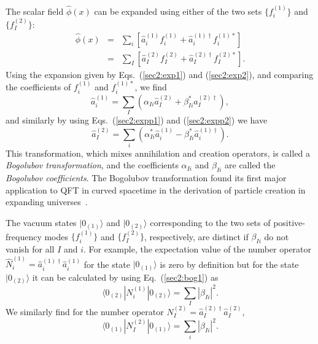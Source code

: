 \documentclass[12pt,nofootinbib,floatfix,aps,prd,showpacs,amsmath,amssymb,eqsecnum]{revtex4-2}
\let\cite\citep
\begin{document}
The scalar field $\hat{\phi}(x)$ 
can be expanded using either of the two sets $\{f_i^{(1)}\}$ and 
$\{f_I^{(2)}\}$:
\begin{eqnarray}
\hat{\phi}(x) & = & 
\sum_i \left[ \hat{a}_i^{(1)}f_i^{(1)} + \hat{a}_i^{(1)\dagger}
f_i^{(1)*}\right] \nonumber \\
& = & \sum_I\left[ \hat{a}_I^{(2)}f_I^{(2)} + \hat{a}_I^{(2)\dagger}
f_I^{(2)*}\right].
\end{eqnarray}
Using the expansion given by Eqs.~(\ref{sec2:exp1}) and (\ref{sec2:exp2}),
and comparing the coefficients of $f_i^{(1)}$ and $f_i^{(1)*}$, we find
\begin{equation}
\hat{a}_i^{(1)} = \sum_I (\alpha_{Ii}\hat{a}_I^{(2)} 
+ \beta_{Ii}^* \hat{a}_I^{(2)\dagger}), \label{sec2:bog1}
\end{equation} 
and similarly by using 
Eqs.~(\ref{sec2:expp1}) and (\ref{sec2:expp2}) we have
\begin{equation}
\hat{a}_I^{(2)} = \sum_i (\alpha_{Ii}^*\hat{a}_i^{(1)} 
- \beta_{Ii}^* \hat{a}_i^{(1)\dagger}). \label{sec2:bog2}
\end{equation}
This transformation, which mixes annihilation and creation operators, 
is called a
{\em Bogolubov transformation}, 
and the coefficients $\alpha_{Ii}$ and $\beta_{Ii}$
are called the {\em Bogolubov coefficients}.  
The Bogolubov transformation found its
first major application to QFT in curved spacetime in
the derivation of particle creation in expanding
universes~\cite{Parker68,Sexletal69}. 

The vacuum states $|0_{(1)}\rangle$ and $|0_{(2)}\rangle$ 
corresponding to the two sets of positive-frequency modes 
$\{f_i^{(1)}\}$ and $\{f_I^{(2)}\}$, respectively, are distinct if 
$\beta_{Ii}$ do not vanish for all $I$ and $i$.  For example, the
expectation value of the number operator
$\hat{N}^{(1)}_i = \hat{a}_i^{(1)\dagger}\hat{a}_i^{(1)}$ for the state
$|0_{(1)}\rangle$ is zero by definition but for the state
$|0_{(2)}\rangle$ it can be calculated by using Eq.~(\ref{sec2:bog1}) as
\begin{equation}
\langle 0_{(2)}|N^{(1)}_i|0_{(2)}\rangle  = \sum_I |\beta_{Ii}|^2.
\end{equation}
We similarly find for the number operator 
$N^{(2)}_I = \hat{a}_I^{(2)\dagger}\hat{a}_I^{(2)}$,
\begin{equation}
\langle 0_{(1)}|N^{(2)}_I|0_{(1)}\rangle = \sum_i |\beta_{Ii}|^2.
\end{equation}
\end{document}
